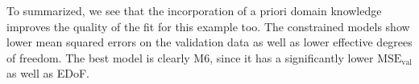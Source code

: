 To summarized, we see that the incorporation of a priori domain knowledge improves the quality of the fit for this example too. The constrained models show lower mean squared errors on the validation data as well as lower effective degrees of freedom. The best model is clearly M6, since it has a significantly lower $\text{MSE}_{\text{val}}$ as well as EDoF. 